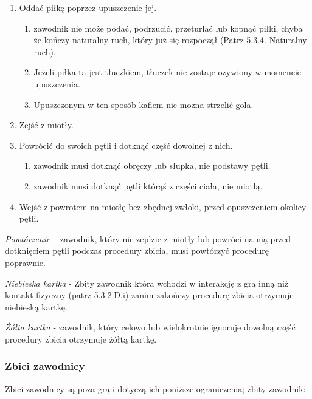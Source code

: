 \documentclass[12pt]{article}
\begin{document}
\begin{enumerate}
\item
  Oddać piłkę poprzez upuszczenie jej.

  \begin{enumerate}
  \item
        zawodnik nie może podać, podrzucić, przeturlać lub kopnąć piłki,
    chyba że kończy naturalny ruch, który już się rozpoczął (Patrz
    5.3.4. Naturalny ruch).
      \item
        Jeżeli piłka ta jest tłuczkiem, tłuczek nie zostaje ożywiony w
    momencie upuszczenia.
      \item
        Upuszczonym w ten sposób kaflem nie można strzelić gola.
      \end{enumerate}
\item
    Zejść z miotły.
  \item
  Powrócić do swoich pętli i dotknąć część dowolnej z nich.

  \begin{enumerate}
  \item
        zawodnik musi dotknąć obręczy lub słupka, nie podstawy pętli.
      \item
        zawodnik musi dotknąć pętli którąś z części ciała, nie miotłą.
      \end{enumerate}
\item Wejść z powrotem na miotłę bez zbędnej zwłoki, przed opuszczeniem
      okolicy pętli.
      
    \end{enumerate}
    
\emph{Powtórzenie} -- zawodnik, który nie zejdzie z miotły lub powróci
na nią przed dotknięciem pętli podczas procedury zbicia, musi powtórzyć
procedurę poprawnie.

\emph{Niebieska kartka} - Zbity zawodnik która wchodzi w interakcję z
grą inną niż kontakt fizyczny (patrz 5.3.2.D.i) zanim zakończy procedurę
zbicia otrzymuje niebieską kartkę.

\emph{Żółta kartka} - zawodnik, który celowo lub wielokrotnie ignoruje
dowolną część procedury zbicia otrzymuje żółtą kartkę.

\subsubsection{Zbici zawodnicy}

Zbici zawodnicy są poza grą i dotyczą ich poniższe ograniczenia; zbity
zawodnik:
\end{document}
